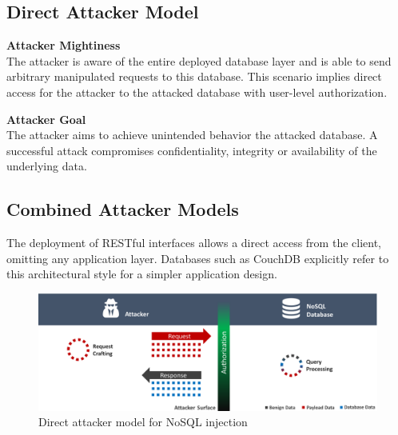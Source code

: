 \subsection{Direct Attacker Model}

\begin{minipage}[t]{0.48\textwidth}
  \textbf{Attacker Mightiness} \\ 
  The attacker is aware of the entire deployed database layer and is able to send arbitrary manipulated requests to this database. This scenario implies direct access for the attacker to the attacked database with user-level authorization.
\end{minipage}
\hfill
\begin{minipage}[t]{0.48\textwidth}
  \textbf{Attacker Goal} \\ 
  The attacker aims to achieve unintended behavior the attacked database. A successful attack compromises confidentiality, integrity or availability of the underlying data.
\end{minipage}

\subsection{Combined Attacker Models}

The deployment of RESTful interfaces allows a direct access from the client, omitting any application layer. Databases such as CouchDB explicitly refer to this architectural style for a simpler application design.


\begin{figure}[h]
\centering
  \includegraphics[width=1\linewidth]{Images/attacker_model_direct}
  \caption{Direct attacker model for NoSQL injection}
  \label{fig:extendedAttackerModel}
\end{figure}


